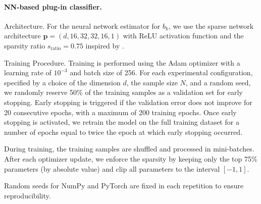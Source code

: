 \documentclass{article}
\theoremstyle{plain}
\theoremstyle{definition}
\theoremstyle{remark}
\begin{document}
\paragraph{NN-based plug-in classifier.}  \:%


{\sc Architecture.} For the neural network estimator for $b_k$,  we use the sparse network architecture $\mathbf{p}= (d, 16, 32, 32, 16, 1)$ with ReLU activation function and the sparsity ratio $s_{\text{ratio}} = 0.75$ inspired by \citet{zhao2025drift}. 

{\sc Training Procedure.}
Training is performed using the Adam optimizer with a learning rate of $10^{-3}$ and batch size of 256.  For each experimental configuration, specified by a choice of the dimension $d$, the sample size $N$, and a random seed, we randomly reserve 50\% of the training samples as a validation set for early stopping. Early stopping is triggered if the validation error does not improve for 20 consecutive epochs, with a maximum of 200 training epochs. Once early stopping is activated, we retrain the model on the full training dataset for a number of epochs equal to twice the epoch at which early stopping occurred.


During training, the training samples are shuffled and processed in mini-batches. After each optimizer update, we enforce the sparsity by keeping only the top 75\% parameters (by absolute value) and clip all parameters to the interval $[-1, 1]$. 

Random seeds for NumPy and PyTorch are fixed in each repetition to ensure reproducibility.
\end{document}
